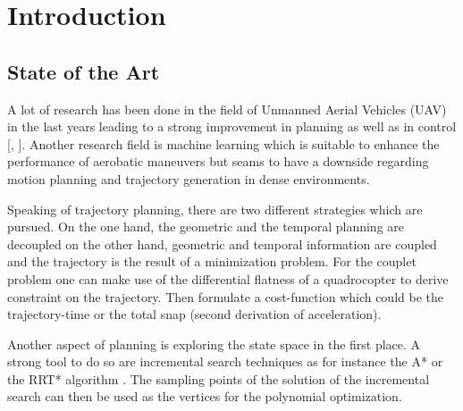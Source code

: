 
\chapter{Introduction}\label{sec:introduction}

\section{State of the Art}\label{sec:state}

A lot of research has been done in the field of Unmanned Aerial Vehicles (UAV) in the last years leading to a strong improvement in planning \cite{he} as well as in control [\cite{colling}, \cite{hehn}].  Another research field is machine learning \cite{lup} which is suitable to enhance the performance of aerobatic maneuvers but seams to have a downside regarding motion planning and trajectory generation in dense environments. \newline

Speaking of trajectory planning, there are two different strategies which are pursued. On the one hand, the geometric and the temporal planning are decoupled  \cite{bou} on the other hand, geometric and temporal information are coupled and the trajectory is the result of a minimization problem. For the couplet problem one can make use of the differential flatness of a quadrocopter to derive constraint on the trajectory. Then formulate a cost-function which could be the trajectory-time \cite{hehn} or the total snap \cite{mellinger} (second derivation of acceleration). \newline

Another aspect of planning is exploring the state space in the first place. A strong tool to do so are incremental search techniques as for instance the A* \cite{lik} or the RRT* algorithm \cite{richter}. The sampling points of the solution of the incremental search can then be used as the vertices for the polynomial optimization.

